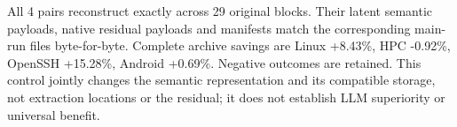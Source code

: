 All 4 pairs reconstruct exactly across 29 original blocks. Their latent semantic payloads, native residual payloads and manifests match the corresponding main-run files byte-for-byte.
Complete archive savings are Linux +8.43\%, HPC -0.92\%, OpenSSH +15.28\%, Android +0.69\%. Negative outcomes are retained. This control jointly changes the semantic representation and its compatible storage, not extraction locations or the residual; it does not establish LLM superiority or universal benefit.

